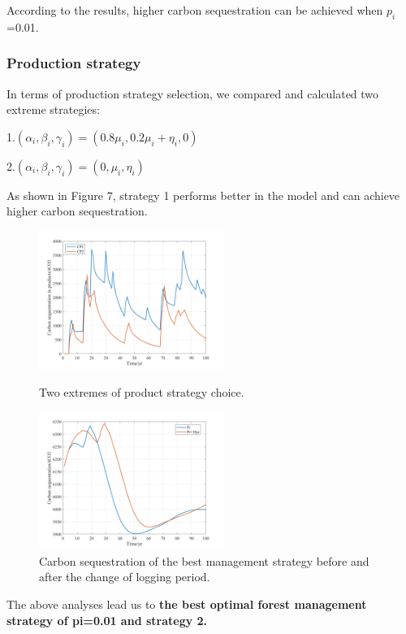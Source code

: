 According to the results, higher carbon sequestration can be achieved when $p_i$ =0.01.

\subsubsection{Production strategy}

In terms of production strategy selection, we compared and calculated two extreme strategies:

1.$\left(\alpha_{i}, \beta_{i}, \gamma_{i}\right)=\left(0.8 \mu_{i}, 0.2 \mu_{i}+\eta_{i}, 0\right)$

2.$\left(\alpha_{i}, \beta_{i}, \gamma_{i}\right)=\left(0, \mu_{i}, \eta_{i}\right)$

As shown in Figure $7$, strategy 1 performs better in the model and can achieve higher carbon sequestration.
\begin{figure}[htbp]
\centering
\begin{minipage}[t]{0.48\textwidth}
\centering
\includegraphics[width=6cm]{figs/Product_S.png}
\caption{Two extremes of product strategy choice.}
\end{minipage}
\begin{minipage}[t]{0.48\textwidth}
\centering
\includegraphics[width=6cm]{figs/Score.png}
\caption{Carbon sequestration of the best management strategy before and after the change of logging period.}
\end{minipage}
\end{figure}

The above analyses lead us to \textbf{the best optimal forest management strategy of pi=0.01 and strategy 2.}

